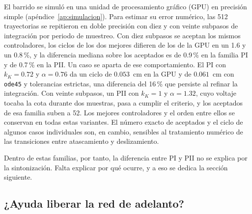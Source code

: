 El barrido se simuló en una unidad de procesamiento gráfico (GPU) en precisión simple (apéndice~\ref{ap:simulacion}). Para estimar su error numérico, las 512 trayectorias se repitieron en doble precisión con diez y con veinte subpasos de integración por periodo de muestreo. Con diez subpasos se aceptan los mismos controladores, los ciclos de los dos mejores difieren de los de la GPU en un 1.6 y un 0.8\,\%, y la diferencia mediana sobre los aceptados es de 0.9\,\% en la familia PI y de 0.7\,\% en la PII. Un caso se aparta de ese comportamiento. El PI con $k_K=0.72$ y $\alpha=0.76$ da un ciclo de $0.053$~cm en la GPU y de $0.061$~cm con \texttt{ode45} y tolerancias estrictas, una diferencia del 16\,\% que persiste al refinar la integración. Con veinte subpasos, un PII con $k_K=1$ y $\alpha=1.32$, cuyo voltaje tocaba la cota durante dos muestras, pasa a cumplir el criterio, y los aceptados de esa familia suben a 52. Los mejores controladores y el orden entre ellos se conservan en todas estas variantes. El número exacto de aceptados y el ciclo de algunos casos individuales son, en cambio, sensibles al tratamiento numérico de las transiciones entre atascamiento y deslizamiento.

Dentro de estas familias, por tanto, la diferencia entre PI y PII no se explica por la sintonización. Falta explicar por qué ocurre, y a eso se dedica la sección siguiente.

\subsection{¿Ayuda liberar la red de adelanto?}\label{sec:pii_v2}

